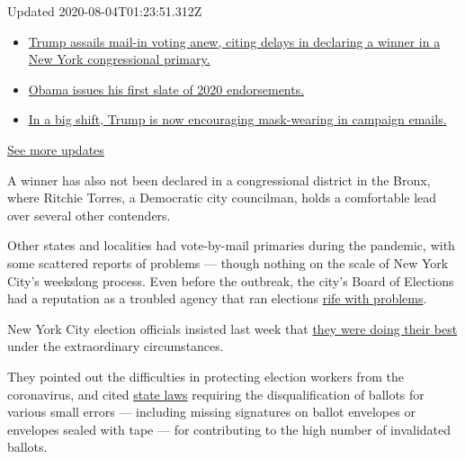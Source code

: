 Updated 2020-08-04T01:23:51.312Z

\begin{itemize}
\tightlist
\item
  \href{https://www.nytimes.com/2020/08/03/us/elections/biden-vs-trump.html?action=click\&pgtype=Article\&state=default\&region=MAIN_CONTENT_1\&context=storylines_live_updates\#link-6494b448}{Trump
  assails mail-in voting anew, citing delays in declaring a winner in a
  New York congressional primary.}
\item
  \href{https://www.nytimes.com/2020/08/03/us/elections/biden-vs-trump.html?action=click\&pgtype=Article\&state=default\&region=MAIN_CONTENT_1\&context=storylines_live_updates\#link-3de249e6}{Obama
  issues his first slate of 2020 endorsements.}
\item
  \href{https://www.nytimes.com/2020/08/03/us/elections/biden-vs-trump.html?action=click\&pgtype=Article\&state=default\&region=MAIN_CONTENT_1\&context=storylines_live_updates\#link-54e34d20}{In
  a big shift, Trump is now encouraging mask-wearing in campaign
  emails.}
\end{itemize}

\href{https://www.nytimes.com/2020/08/03/us/elections/biden-vs-trump.html?action=click\&pgtype=Article\&state=default\&region=MAIN_CONTENT_1\&context=storylines_live_updates}{See
more updates}

A winner has also not been declared in a congressional district in the
Bronx, where Ritchie Torres, a Democratic city councilman, holds a
comfortable lead over several other contenders.

Other states and localities had vote-by-mail primaries during the
pandemic, with some scattered reports of problems --- though nothing on
the scale of New York City's weekslong process. Even before the
outbreak, the city's Board of Elections had a reputation as a troubled
agency that ran elections
\href{https://www.nytimes.com/2018/11/07/nyregion/voting-problems-nyc-.html}{rife
with problems}.

New York City election officials insisted last week that
\href{https://www.nytimes.com/2020/07/17/nyregion/election-absentee-ballots-primary.html}{they
were doing their best} under the extraordinary circumstances.

They pointed out the difficulties in protecting election workers from
the coronavirus, and cited
\href{https://www.nysenate.gov/legislation/laws/ELN/9-209}{state laws}
requiring the disqualification of ballots for various small errors ---
including missing signatures on ballot envelopes or envelopes sealed
with tape --- for contributing to the high number of invalidated
ballots.

